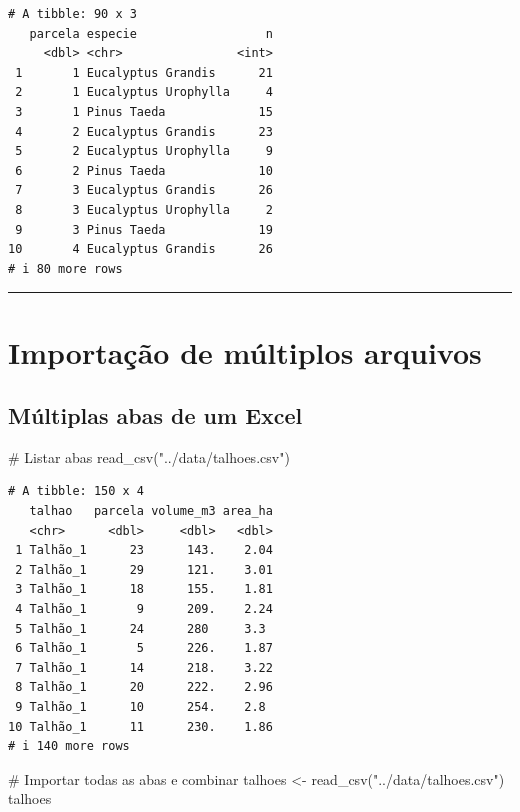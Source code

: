 \documentclass[
  letterpaper,
]{scrbook}
\newenvironment{Shaded}{\begin{snugshade}}{\end{snugshade}}
\newcommand{\CommentTok}[1]{\textcolor[rgb]{0.37,0.37,0.37}{#1}}
\newcommand{\FunctionTok}[1]{\textcolor[rgb]{0.28,0.35,0.67}{#1}}
\newcommand{\NormalTok}[1]{\textcolor[rgb]{0.00,0.23,0.31}{#1}}
\newcommand{\OtherTok}[1]{\textcolor[rgb]{0.00,0.23,0.31}{#1}}
\newcommand{\StringTok}[1]{\textcolor[rgb]{0.13,0.47,0.30}{#1}}
\begin{document}
\begin{verbatim}
# A tibble: 90 x 3
   parcela especie                  n
     <dbl> <chr>                <int>
 1       1 Eucalyptus Grandis      21
 2       1 Eucalyptus Urophylla     4
 3       1 Pinus Taeda             15
 4       2 Eucalyptus Grandis      23
 5       2 Eucalyptus Urophylla     9
 6       2 Pinus Taeda             10
 7       3 Eucalyptus Grandis      26
 8       3 Eucalyptus Urophylla     2
 9       3 Pinus Taeda             19
10       4 Eucalyptus Grandis      26
# i 80 more rows
\end{verbatim}

\begin{center}\rule{0.5\linewidth}{0.5pt}\end{center}

\section{Importação de múltiplos
arquivos}\label{importauxe7uxe3o-de-muxfaltiplos-arquivos}

\subsection{Múltiplas abas de um
Excel}\label{muxfaltiplas-abas-de-um-excel}

\begin{Shaded}
\begin{Highlighting}[]
\CommentTok{\# Listar abas}
\FunctionTok{read\_csv}\NormalTok{(}\StringTok{"../data/talhoes.csv"}\NormalTok{)}
\end{Highlighting}
\end{Shaded}

\begin{verbatim}
# A tibble: 150 x 4
   talhao   parcela volume_m3 area_ha
   <chr>      <dbl>     <dbl>   <dbl>
 1 Talhão_1      23      143.    2.04
 2 Talhão_1      29      121.    3.01
 3 Talhão_1      18      155.    1.81
 4 Talhão_1       9      209.    2.24
 5 Talhão_1      24      280     3.3 
 6 Talhão_1       5      226.    1.87
 7 Talhão_1      14      218.    3.22
 8 Talhão_1      20      222.    2.96
 9 Talhão_1      10      254.    2.8 
10 Talhão_1      11      230.    1.86
# i 140 more rows
\end{verbatim}

\begin{Shaded}
\begin{Highlighting}[]
\CommentTok{\# Importar todas as abas e combinar}
\NormalTok{talhoes }\OtherTok{\textless{}{-}} \FunctionTok{read\_csv}\NormalTok{(}\StringTok{"../data/talhoes.csv"}\NormalTok{)}
\NormalTok{talhoes}
\end{Highlighting}
\end{Shaded}
\end{document}
